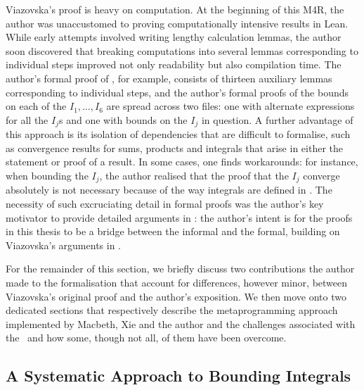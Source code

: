 Viazovska's proof is heavy on computation. At the beginning of this M4R, the author was unaccustomed to proving computationally intensive results in Lean. While early attempts involved writing lengthy calculation lemmas, the author soon discovered that breaking computations into several lemmas corresponding to individual steps improved not only readability but also compilation time. The author's formal proof of , for example, consists of thirteen auxiliary lemmas corresponding to individual steps, and the author's formal proofs of the bounds on each of the $I_1, \ldots, I_6$ are spread across two files: one with alternate expressions for all the $I_j$s and one with bounds on the $I_j$ in question. A further advantage of this approach is its isolation of dependencies that are difficult to formalise, such as convergence results for sums, products and integrals that arise in either the statement or proof of a result. In some cases, one finds workarounds: for instance, when bounding the $I_j$, the author realised that the proof that the $I_j$ converge absolutely is not necessary because of the way integrals are defined in \mathlib. The necessity of such excruciating detail in formal proofs was the author's key motivator to provide detailed arguments in : the author's intent is for the proofs in this thesis to be a bridge between the informal and the formal, building on Viazovska's arguments in \cite[\S 7]{blueprint}.

For the remainder of this section, we briefly discuss two contributions the author made to the formalisation that account for differences, however minor, between Viazovska's original proof and the author's exposition. We then move onto two dedicated sections that respectively describe the metaprogramming approach implemented by Macbeth, Xie and the author and the challenges associated with the \CGT\ and how some, though not all, of them have been overcome.

\subsection{A Systematic Approach to Bounding Integrals}
\label{Ch5:Subsec:Bounding_Integrals}

